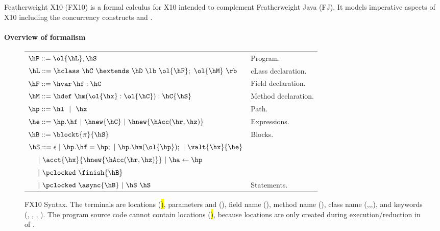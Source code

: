 Featherweight X10 (FX10) is a formal calculus for X10 intended to  complement Featherweight Java
(FJ).  It models imperative aspects of X10 including the concurrency
constructs \hfinish{} and \hasync{}.


\paragraph{Overview of formalism}

\begin{figure}[htpb!]
\begin{center}
\begin{tabular}{|l|l|}
\hline

$\hP ::= \ol{\hL},\hS$ & Program. \\

$\hL ::= \hclass ~ \hC~\hextends~\hD~\lb~\ol{\hF};~\ol{\hM}~\rb$
& cLass declaration. \\

$\hF ::= \hvar\,\hf:\hC$
& Field declaration. \\

$\hM ::= \hdef\ \hm(\ol{\hx}:\ol{\hC}):\hC\{\hS\}$
& Method declaration. \\

$\hp ::= \hl ~~|~~ \hx$
& Path. \\ %

$\he ::=  \hp.\hf  ~|~ \hnew{\hC} ~|~ \hnew{\hAcc(\hr,\hz)}$
& Expressions. \\ %
$\hB ::= \blockt{\pi}{\hS}$
& Blocks. \\
$\hS ::=  \epsilon ~|~\hp.\hf = \hp; ~|~ \hp.\hm(\ol{\hp});  ~|~ \valt{\hx}{\he}$ &\\
$~~~~|~\acct{\hx}{\hnew{\hAcc(\hr,\hz)}} ~|~ \ha \leftarrow \hp$ &\\
$~~~~|~ \pclocked~\finish{\hB}$&\\
$~~~~|~ \pclocked~\async{\hB}~|~ \hS~\hS$
& Statements. \\ %

\hline
\end{tabular}
\end{center}
\caption{FX10 Syntax.
    The terminals are locations (\hl), parameters and \hthis (\hx), field name (\hf), method name (\hm), class name (\hB,\hC,\hD,\hObject),
        and keywords (\hhnew, \hfinish, \hasync, ).
    The program source code cannot contain locations (\hl), because locations are only created during execution/reduction in  of .
    }
\label{Figure:syntax}
\end{figure}

